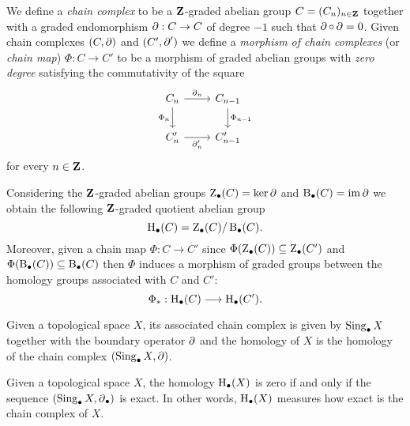 \begin{definition}
    \label{def:chain-complex}
    We define a \emph{chain complex} to be a \(\mathbf{Z}\)-graded abelian group
    \(C = (C_n)_{n \in \mathbf{Z}}\) together with a graded endomorphism \(\operatorname{\partial}: C \to C\)
    of degree \(-1\) such that \(\operatorname{\partial} \circ \operatorname{\partial} = 0\). Given chain complexes
    \((C, \operatorname{\partial})\) and \((C', \operatorname{\partial}')\) we define a \emph{morphism of chain
        complexes} (or \emph{chain map}) \(\Phi: C \to C'\) to be a morphism of graded
    abelian groups with \emph{zero degree} satisfying the commutativity of the
    square
    \[
        \begin{tikzcd}
            C_n \ar[d, "\Phi_n"'] \ar[r, "\face_n"] &C_{n-1} \ar[d, "\Phi_{n-1}"] \\
            C_n' \ar[r, "\face_n'"'] &C_{n-1}'
        \end{tikzcd}
    \]
    for every \(n \in \mathbf{Z}\).

    Considering the \(\mathbf{Z}\)-graded abelian groups \(\operatorname{Z}_{\bullet}(C) = \ker
    \operatorname{\partial}\) and \(\operatorname{B}_{\bullet}(C) = \operatorname{im} \operatorname{\partial}\) we obtain the following
    \(\mathbf{Z}\)-graded quotient abelian group
    \[
        \operatorname{H}_{\bullet}(C) = \operatorname{Z}_{\bullet}(C)/\operatorname{B}_{\bullet}(C).
    \]
    Moreover, given a chain map \(\Phi: C \to C'\) since
    \(\Phi(\operatorname{Z}_{\bullet}(C)) \subseteq \operatorname{Z}_{\bullet}(C')\) and
    \(\Phi(\operatorname{B}_{\bullet}(C)) \subseteq \operatorname{B}_{\bullet}(C)\) then \(\Phi\) induces
    a morphism of graded groups between the homology groups associated with \(C\)
    and \(C'\):
    \[
        \Phi_{*}: \operatorname{H}_{\bullet}(C) \longrightarrow \operatorname{H}_{\bullet}(C').
    \]

    Given a topological space \(X\), its associated chain complex is given by
    \(\operatorname{Sing}_{\bullet} X\) together with the boundary operator \(\operatorname{\partial}\) and the
    homology of \(X\) is the homology of the chain complex \((\operatorname{Sing}_{\bullet} X, \operatorname{\partial})\).
\end{definition}

\begin{corollary}
    \label{cor:homology-zero-iff-seq-is-exact}
    Given a topological space \(X\), the homology \(\operatorname{H}_{\bullet}(X)\) is zero if
    and only if the sequence \((\operatorname{Sing}_{\bullet} X, \operatorname{\partial}_{\bullet})\) is
    exact. In other words, \(\operatorname{H}_{\bullet}(X)\) measures how exact is the chain
    complex of \(X\).
\end{corollary}

